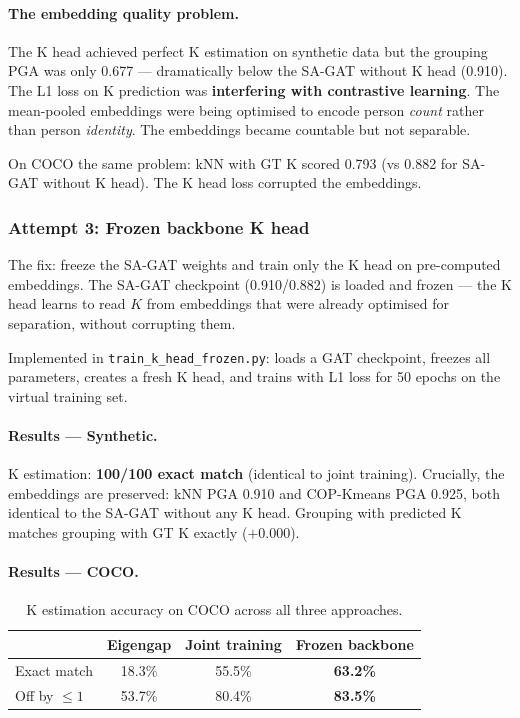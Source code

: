 \paragraph{The embedding quality problem.}

The K head achieved perfect K estimation on synthetic data but the grouping PGA was only 0.677 --- dramatically below the SA-GAT without K head (0.910). The L1 loss on K prediction was \textbf{interfering with contrastive learning}. The mean-pooled embeddings were being optimised to encode person \emph{count} rather than person \emph{identity}. The embeddings became countable but not separable.

On COCO the same problem: kNN with GT K scored 0.793 (vs 0.882 for SA-GAT without K head). The K head loss corrupted the embeddings.


\subsubsection{Attempt 3: Frozen backbone K head}

The fix: freeze the SA-GAT weights and train only the K head on pre-computed embeddings. The SA-GAT checkpoint (0.910/0.882) is loaded and frozen --- the K head learns to read $K$ from embeddings that were already optimised for separation, without corrupting them.

Implemented in \texttt{train\_k\_head\_frozen.py}: loads a GAT checkpoint, freezes all parameters, creates a fresh K head, and trains with L1 loss for 50 epochs on the virtual training set.

\paragraph{Results --- Synthetic.}

K estimation: \textbf{100/100 exact match} (identical to joint training). Crucially, the embeddings are preserved: kNN PGA 0.910 and COP-Kmeans PGA 0.925, both identical to the SA-GAT without any K head. Grouping with predicted K matches grouping with GT K exactly ($+$0.000).

\paragraph{Results --- COCO.}

\begin{table}[H]
\centering
\footnotesize
\begin{tabular}{lccc}
\toprule
 & Eigengap & Joint training & Frozen backbone \\
\midrule
Exact match & 18.3\% & 55.5\% & \textbf{63.2\%} \\
Off by $\leq 1$ & 53.7\% & 80.4\% & \textbf{83.5\%} \\
\bottomrule
\end{tabular}
\caption{K estimation accuracy on COCO across all three approaches.}
\end{table}


